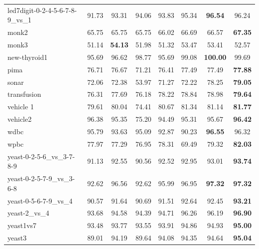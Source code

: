 \begin{table}[!p]
{\begin{tabular}{lccccccc}
led7digit-0-2-4-5-6-7-8-9\_vs\_1 & 91.73 & 93.31 & 94.06 & 93.83 & 95.34 & \textbf{96.54} & 96.24 \\
monk2 & 65.75 & 65.75 & 65.75 & 66.02 & 66.69 & 66.57 & \textbf{67.35} \\
monk3 & 51.14 & \textbf{54.13} & 51.98 & 51.32 & 53.47 & 53.41 & 52.57 \\
new-thyroid1 & 95.69 & 96.62 & 98.77 & 95.69 & 99.08 & \textbf{100.00} & 99.69 \\
pima & 76.71 & 76.67 & 71.21 & 76.41 & 77.49 & 77.49 & \textbf{77.88} \\
sonar & 72.06 & 72.38 & 53.97 & 71.27 & 72.22 & 78.25 & \textbf{79.05} \\
transfusion & 76.31 & 77.69 & 76.18 & 78.22 & 78.84 & 78.98 & \textbf{79.64} \\
vehicle 1 & 79.61 & 80.04 & 74.41 & 80.67 & 81.34 & 81.14 & \textbf{81.77} \\
vehicle2 & 96.38 & 95.35 & 75.20 & 94.49 & 95.31 & 95.67 & \textbf{96.42} \\
wdbc & 95.79 & 93.63 & 95.09 & 92.87 & 90.23 & \textbf{96.55} & 96.32 \\
wpbc & 77.97 & 77.29 & 76.95 & 78.31 & 69.49 & 79.32 & \textbf{82.03} \\
yeast-0-2-5-6\_vs\_3-7-8-9 & 91.13 & 92.55 & 90.56 & 92.52 & 92.95 & 93.01 & \textbf{93.74} \\
yeast-0-2-5-7-9\_vs\_3-6-8 & 92.62 & 96.56 & 92.62 & 95.99 & 96.95 & \textbf{97.32} & \textbf{97.32} \\
yeast-0-5-6-7-9\_vs\_4 & 90.57 & 91.64 & 90.69 & 91.51 & 92.64 & 92.45 & \textbf{93.21} \\
yeast-2\_vs\_4 & 93.68 & 94.58 & 94.39 & 94.71 & 96.26 & 96.19 & \textbf{96.90} \\
yeast1vs7 & 93.48 & 93.77 & 93.55 & 93.91 & 94.86 & 94.93 & \textbf{95.00} \\
yeast3 & 89.01 & 94.19 & 89.64 & 94.08 & 94.35 & 94.64 & \textbf{95.04} \\
\bottomrule
\end{tabular}}
\end{table}
